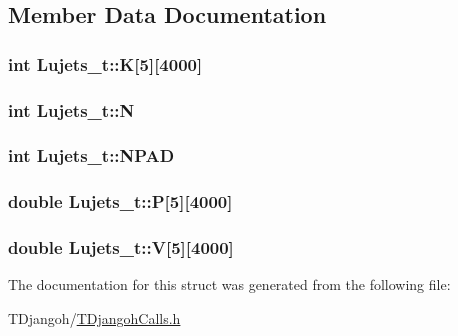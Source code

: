 \subsection{Member Data Documentation}
\hypertarget{struct_lujets__t_ad8aaaaff1a45805c18b56154446bdf16}{
\subsubsection[{K}]{\setlength{\rightskip}{0pt plus 5cm}int Lujets\+\_\+t\+::\+K\mbox{[}5\mbox{]}\mbox{[}4000\mbox{]}}}\label{struct_lujets__t_ad8aaaaff1a45805c18b56154446bdf16}
\hypertarget{struct_lujets__t_a17571954fa27f93e7a5bdaf763057547}{
\subsubsection[{N}]{\setlength{\rightskip}{0pt plus 5cm}int Lujets\+\_\+t\+::\+N}}\label{struct_lujets__t_a17571954fa27f93e7a5bdaf763057547}
\hypertarget{struct_lujets__t_a9bfadb28d8093e469dfed54f7df5b80e}{
\subsubsection[{N\+P\+A\+D}]{\setlength{\rightskip}{0pt plus 5cm}int Lujets\+\_\+t\+::\+N\+P\+A\+D}}\label{struct_lujets__t_a9bfadb28d8093e469dfed54f7df5b80e}
\hypertarget{struct_lujets__t_aec85d7058f39ff74657d6d7f8ef54d21}{
\subsubsection[{P}]{\setlength{\rightskip}{0pt plus 5cm}double Lujets\+\_\+t\+::\+P\mbox{[}5\mbox{]}\mbox{[}4000\mbox{]}}}\label{struct_lujets__t_aec85d7058f39ff74657d6d7f8ef54d21}
\hypertarget{struct_lujets__t_a0a2bde586f224cda7072d27ed5df78f5}{
\subsubsection[{V}]{\setlength{\rightskip}{0pt plus 5cm}double Lujets\+\_\+t\+::\+V\mbox{[}5\mbox{]}\mbox{[}4000\mbox{]}}}\label{struct_lujets__t_a0a2bde586f224cda7072d27ed5df78f5}


The documentation for this struct was generated from the following file\+:\begin{DoxyCompactItemize}
\item 
T\+Djangoh/\hyperlink{_t_djangoh_calls_8h}{T\+Djangoh\+Calls.\+h}\end{DoxyCompactItemize}
